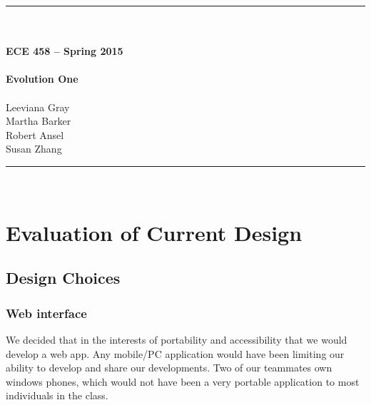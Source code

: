 \documentclass{article}
\begin{document}
\begin{center}
\rule{6.5in}{0.5mm}\\~\\
{\bf \large ECE 458 -- Spring 2015}\\~\\  
{\huge \bf Evolution One}\\~\\
Leeviana Gray\\
Martha Barker\\
Robert Ansel\\
Susan Zhang\\
\rule{6.5in}{0.5mm}\\
\end{center}
\tableofcontents
\pagebreak






\section{Evaluation of Current Design}
\subsection{Design Choices}

\subsubsection{Web interface}
We decided that in the interests of portability and accessibility that we would develop a web app. Any mobile/PC application would have been limiting our ability to develop and share our developments. Two of our teammates own windows phones, which would not have been a very portable application to most individuals in the class.
\end{document}
